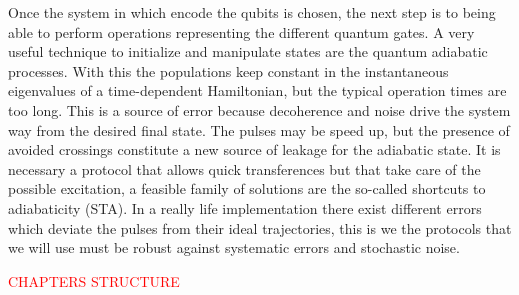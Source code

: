 Once the system in which encode the qubits is chosen, the next step is to being able to perform operations representing the different quantum gates. A very useful technique to initialize and manipulate states are the quantum adiabatic processes. With this the populations keep constant in the instantaneous eigenvalues of a time-dependent Hamiltonian, but the typical operation times are too long. This is a source of error because decoherence and noise drive the system way from the desired final state. The pulses may be speed up, but the presence of avoided crossings constitute a new source of leakage for the adiabatic state. It is necessary a protocol that allows quick transferences but that take care of the possible excitation, a feasible family of solutions are the so-called shortcuts to adiabaticity (STA). In a really life implementation there exist different errors which deviate the pulses from their ideal trajectories, this is we the protocols that we will use must be robust against systematic errors and stochastic noise.\\

\begin{center}
	\textcolor{red}{CHAPTERS STRUCTURE}
\end{center}








